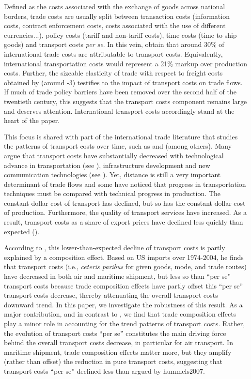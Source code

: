 \documentclass[a4paper,11pt]{article}
\begin{document}
Defined as the costs associated with the exchange of goods across national borders, trade costs are usually split between transaction costs (information costs, contract enforcement costs, costs associated with the use of different currencies...), policy costs (tariff  and non-tariff costs), time costs (time to ship goods) and transport costs \emph{per se}. In this vein, \citet{anderson_wincoop_jel} obtain that around 30\% of international trade costs are attributable to transport costs. Equivalently, international transportation costs would represent a 21\% markup over production costs. Further, the sizeable elasticity of trade with respect to freight costs obtained by \cite{Behar_Venables} (around -3) testifies to the impact of transport costs on trade flows. If much of trade policy barriers have been removed over the second half of the twentieth century, this suggests that the transport costs component remains large and deserves attention. International transport costs accordingly stand at the heart of the paper.\smallskip

This focus is shared with part of the international trade literature that studies the patterns of transport costs over time, such as \cite{hummels2007} and \cite{Behar_Venables} (among others). Many argue that transport costs have substantially decreased with technological advance in transportation (see \citealp{levinson2016box}), infrastructure development and new communication technologies (see \citealp{Lafourcade_Thisse}). %
Yet, distance is still a very important determinant of trade flows and some have noticed that progress in transportation techniques must be compared with technical progress in production. The constant-dollar cost of transport has declined, but so has the constant-dollar cost of production. Furthermore, the quality of transport services have increased. As a result, transport costs as a share of export prices have declined less quickly than expected  (\citealp{hummels2007}).\smallskip

According to \cite{hummels2007}, this lower-than-expected decline of transport costs is partly explained by a composition effect. Based on US imports over 1974-2004, he finds that transport costs (i.e., \textit{ceteris paribus} for given goods, mode, and trade routes) have decreased in both air and maritime shipment, but less so than ``per se'' transport costs because trade composition effects have partly offset this ``per se'' transport costs decrease, thereby attenuating the overall transport costs downward trend. In this paper, we investigate the robustness of this result. As a major contribution, and in contrast to \cite{hummels2007}, we find that trade composition effects play a minor role in accounting for the trend patterns of transport costs. Rather, the evolution of transport costs ``per se'' constitutes the main driving force behind the overall transport costs decrease, in particular for air transport. In maritime shipment, trade composition effects matter more, but they amplify (rather than offset) the reduction in pure transport costs, suggesting that transport costs ``per se'' declined less than argued by {hummels2007}.\medskip
\end{document}
